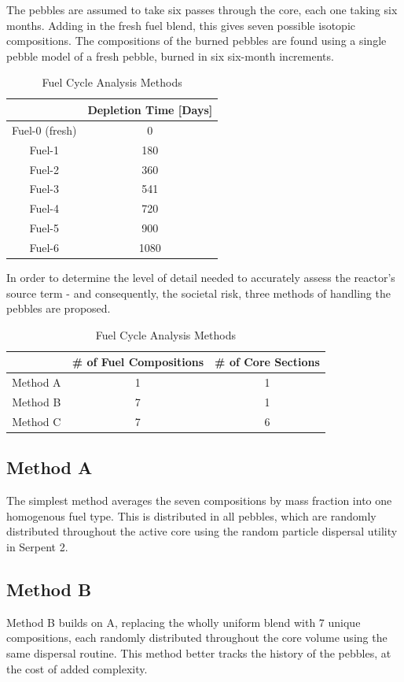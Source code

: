 \documentclass{anstrans}
\begin{document}
The pebbles are assumed to take six passes through the core, each one taking six months.  Adding in the fresh fuel blend, this gives seven possible isotopic compositions.  The compositions of the burned pebbles are found using a single pebble model of a fresh pebble, burned in six six-month increments.

\begin{table}[H]
  \centering
  \caption{Fuel Cycle Analysis Methods}
  	\begin{tabular}{cc}\toprule
 		& Depletion Time [Days]\\
 		\midrule
 		Fuel-0 (fresh) & 0 \\
 		Fuel-1 & 180 \\
 		Fuel-2 & 360 \\
 		Fuel-3 & 541 \\
 		Fuel-4 & 720 \\
 		Fuel-5 & 900 \\
 		Fuel-6 & 1080 \\
	\bottomrule
	\end{tabular}
  \label{tab:fueltypes}
\end{table}

In order to determine the level of detail needed to accurately assess the reactor's source term - and consequently, the societal risk, three methods of handling the pebbles are proposed.

\begin{table}[H]
  \centering
  \caption{Fuel Cycle Analysis Methods}
  	\begin{tabular}{ccc}\toprule
 		& \# of Fuel Compositions & \# of Core Sections \\ \midrule
 		Method A & 1 & 1 \\
 		Method B & 7 & 1 \\
 		Method C & 7 & 6 \\
	\bottomrule
	\end{tabular}
  \label{tab:fuelcycles}
\end{table}

\subsection{Method A}
The simplest method averages the seven compositions by mass fraction into one homogenous fuel type.  This is distributed in all pebbles, which are randomly distributed throughout the active core using the random particle dispersal utility in Serpent 2.
\subsection{Method B}
Method B builds on A, replacing the wholly uniform blend with 7 unique compositions, each randomly distributed throughout the core volume using the same dispersal routine.  This method better tracks the history of the pebbles, at the cost of added complexity.
\end{document}
